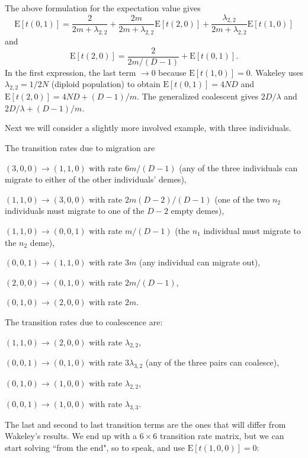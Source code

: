 \documentclass[rmp]{revtex4}
\begin{document}
The above formulation for the expectation value gives
\begin{equation}
\mathrm{E} \left[ t(0,1) \right] = \frac{2}{2m + \lambda_{2,2}} + \frac{2m}{2m + \lambda_{2,2}} \mathrm{E} \left[ t(2,0) \right] + \frac{\lambda_{2,2}}{2m + \lambda_{2,2}} \mathrm{E} \left[ t(1,0) \right]
\end{equation}
and
\begin{equation}
\mathrm{E} \left[ t(2,0) \right] = \frac{2}{2m/(D-1)} + \mathrm{E} \left[ t(0,1) \right].
\end{equation}
In the first expression, the last term $\to 0$ because $\mathrm{E} \left[ t(1,0) \right] = 0$.
Wakeley uses $\lambda_{2,2} = 1/2N$ (diploid population) to obtain $\mathrm{E} \left[ t(0,1) \right] = 4ND$ and $\mathrm{E} \left[ t(2,0) \right] = 4ND + (D-1)/m$.
The generalized coalescent gives $2D/\lambda$ and $2D/\lambda + (D-1)/m$.

Next we will consider a slightly more involved example, with three individuals.

The transition rates due to migration are

$(3,0,0) \to (1,1,0)$ with rate $6m/(D-1)$ (any of the three individuals can migrate to either of the other individuals' demes),

$(1,1,0) \to (3,0,0)$ with rate $2m(D-2)/(D-1)$ (one of the two $n_2$ individuals must migrate to one of the $D-2$ empty demes),

$(1,1,0) \to (0,0,1)$ with rate $m/(D-1)$ (the $n_1$ individual must migrate to the $n_2$ deme),

$(0,0,1) \to (1,1,0)$ with rate $3m$ (any individual can migrate out),

$(2,0,0) \to (0,1,0)$ with rate $2m/(D-1)$,

$(0,1,0) \to (2,0,0)$ with rate $2m$.

The transition rates due to coalescence are:

$(1,1,0) \to (2,0,0)$ with rate $\lambda_{2,2}$,

$(0,0,1) \to (0,1,0)$ with rate $3\lambda_{3,2}$ (any of the three pairs can coalesce),

$(0,1,0) \to (1,0,0)$ with rate $\lambda_{2,2}$,

$(0,0,1) \to (1,0,0)$ with rate $\lambda_{3,3}$.

The last and second to last transition terms are the ones that will differ from Wakeley's results.
We end up with a $6 \times 6$ transition rate matrix, but we can start solving ``from the end", so to speak, and use $\mathrm{E} \left[ t(1,0,0) \right] = 0$:
\end{document}
